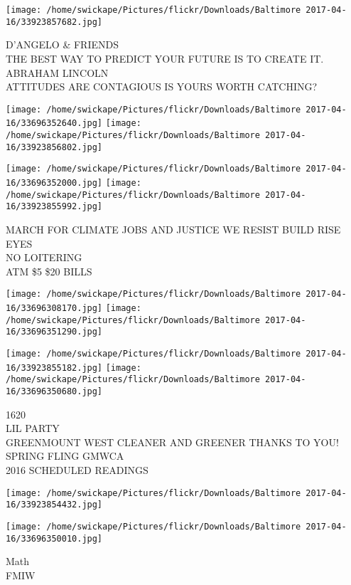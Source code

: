 \documentclass[10pt,letterpaper]{article}
\begin{document}
\vspace{0.25in}
\texttt{[image: /home/swickape/Pictures/flickr/Downloads/Baltimore 2017-04-16/33923857682.jpg]}

D'ANGELO \& FRIENDS\\
THE BEST WAY TO PREDICT YOUR FUTURE IS TO CREATE IT. ABRAHAM LINCOLN\\
ATTITUDES ARE CONTAGIOUS IS YOURS WORTH CATCHING?\\
\pagebreak

\texttt{[image: /home/swickape/Pictures/flickr/Downloads/Baltimore 2017-04-16/33696352640.jpg]}
\texttt{[image: /home/swickape/Pictures/flickr/Downloads/Baltimore 2017-04-16/33923856802.jpg]}

\texttt{[image: /home/swickape/Pictures/flickr/Downloads/Baltimore 2017-04-16/33696352000.jpg]}
\texttt{[image: /home/swickape/Pictures/flickr/Downloads/Baltimore 2017-04-16/33923855992.jpg]}

MARCH FOR CLIMATE JOBS AND JUSTICE WE RESIST BUILD RISE\\
EYES\\
NO LOITERING\\
ATM \$5 \$20 BILLS\\
\pagebreak

\texttt{[image: /home/swickape/Pictures/flickr/Downloads/Baltimore 2017-04-16/33696308170.jpg]}
\texttt{[image: /home/swickape/Pictures/flickr/Downloads/Baltimore 2017-04-16/33696351290.jpg]}

\texttt{[image: /home/swickape/Pictures/flickr/Downloads/Baltimore 2017-04-16/33923855182.jpg]}
\texttt{[image: /home/swickape/Pictures/flickr/Downloads/Baltimore 2017-04-16/33696350680.jpg]}

1620\\
LIL PARTY\\
GREENMOUNT WEST CLEANER AND GREENER THANKS TO YOU!  SPRING FLING GMWCA\\
2016 SCHEDULED READINGS\\
\pagebreak

\texttt{[image: /home/swickape/Pictures/flickr/Downloads/Baltimore 2017-04-16/33923854432.jpg]}

\vspace{0.25in}
\texttt{[image: /home/swickape/Pictures/flickr/Downloads/Baltimore 2017-04-16/33696350010.jpg]}

Math\\
FMIW\\
\pagebreak
\end{document}
